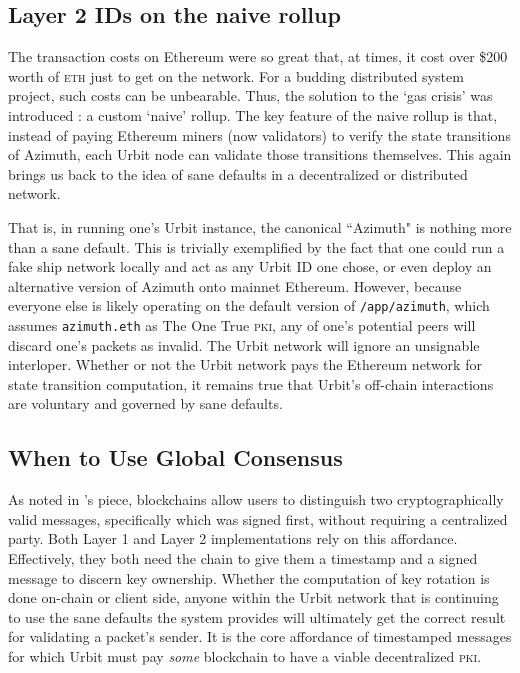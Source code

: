 \documentclass[twoside]{article}
\begin{document}
\subsection{Layer 2 IDs on the naive rollup}

The transaction costs on Ethereum were so great that, at times, it cost over \$200 worth of \textsc{eth} just to get on the network. For a budding distributed system project, such costs can be unbearable. Thus, the solution to the `gas crisis' was introduced \citep{Paprocki2021}: a custom `naive' rollup. The key feature of the naive rollup is that, instead of paying Ethereum miners (now validators) to verify the state transitions of Azimuth, each Urbit node can validate those transitions themselves. This again brings us back to the idea of sane defaults in a decentralized or distributed network. 

That is, in running one's Urbit instance, the canonical ``Azimuth" is nothing more than a sane default. This is trivially exemplified by the fact that one could run a fake ship network locally and act as any Urbit ID one chose, or even deploy an alternative version of Azimuth onto mainnet Ethereum. However, because everyone else is likely operating on the default version of \lstinline[style=inlinecode]{/app/azimuth}, which assumes \lstinline[style=inlinecode]{azimuth.eth} as The One True \textsc{pki}, any of one's potential peers will discard one's packets as invalid. The Urbit network will ignore an unsignable interloper. Whether or not the Urbit network pays the Ethereum network for state transition computation, it remains true that Urbit's off-chain interactions are voluntary and governed by sane defaults.

\subsection{When to Use Global Consensus}

As noted in 's piece, blockchains allow users to distinguish two cryptographically valid messages, specifically which was signed first, without requiring a centralized party. Both Layer 1 and Layer 2 implementations rely on this affordance. Effectively, they both need the chain to give them a timestamp and a signed message to discern key ownership. Whether the computation of key rotation is done on-chain or client side, anyone within the Urbit network that is continuing to use the sane defaults the system provides will ultimately get the correct result for validating a packet's sender. It is the core affordance of timestamped messages for which Urbit must pay \emph{some} blockchain to have a viable decentralized \textsc{pki}.
\end{document}

